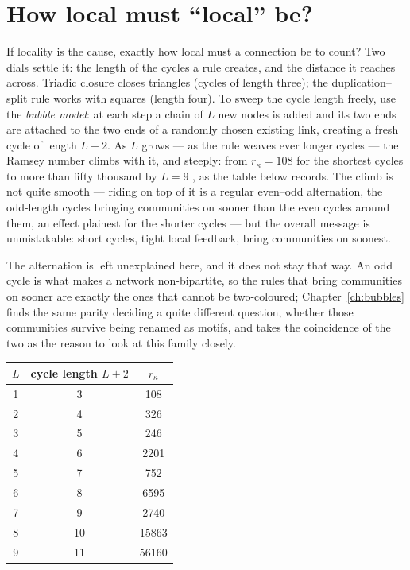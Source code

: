 \section{How local must ``local'' be?}

If locality is the cause, exactly how local must a connection be to count? Two
dials settle it: the length of the cycles a rule creates, and the distance it
reaches across. Triadic closure closes triangles (cycles of length three); the
duplication--split rule works with squares (length four). To sweep the cycle
length freely, use the \emph{bubble model}: at each step a chain of $L$ new nodes
is added and its two ends are attached to the two ends of a randomly chosen
existing link, creating a fresh cycle of length $L+2$. As $L$ grows --- as the
rule weaves ever longer cycles --- the Ramsey number climbs with it, and steeply:
from $r_\kappa=108$ for the shortest cycles to more than fifty thousand by $L=9$
\citep{vazquezcommunities2025}, as the table below records. The climb is not quite
smooth --- riding on top of it is a regular even--odd alternation, the odd-length
cycles bringing communities on sooner than the even cycles around them, an effect
plainest for the shorter cycles --- but the overall message is unmistakable: short
cycles, tight local feedback, bring communities on soonest.

The alternation is left unexplained here, and it does not stay that way. An odd
cycle is what makes a network non-bipartite, so the rules that bring communities
on sooner are exactly the ones that cannot be two-coloured;
Chapter~\ref{ch:bubbles} finds the same parity deciding a quite different
question, whether those communities survive being renamed as motifs, and takes
the coincidence of the two as the reason to look at this family closely.

\begin{center}
\begin{tabular}{ccc}
\hline
$L$ & cycle length $L+2$ & $r_\kappa$ \\
\hline
1 & 3  & 108 \\
2 & 4  & 326 \\
3 & 5  & 246 \\
4 & 6  & 2201 \\
5 & 7  & 752 \\
6 & 8  & 6595 \\
7 & 9  & 2740 \\
8 & 10 & 15863 \\
9 & 11 & 56160 \\
\hline
\end{tabular}
\end{center}

